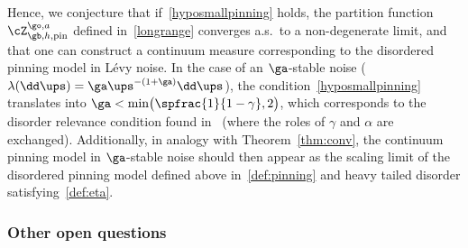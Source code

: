 Hence, we conjecture that if~\eqref{hyposmallpinning} holds, the partition function~$\cZ_{\gb,h,\mathrm{pin}}^{\go,a}$ defined in~\eqref{longrange} converges a.s.\ to a non-degenerate limit, and that one can construct a continuum measure corresponding to the disordered pinning model in Lévy noise.
In the case of an $\ga$-stable noise (\ie $\lambda(\dd \ups) = \ga \ups^{-(1+\ga)} \dd \ups$),
the condition~\eqref{hyposmallpinning} translates into $\ga < \min \bigl(\spfrac{1}{1-\gamma}, 2 \bigr)$,
which corresponds to the disorder relevance condition found in~\cite{LS17} (where the roles of $\gamma$ and $\alpha$ are exchanged).
Additionally, in analogy with Theorem~\ref{thm:conv}, the continuum pinning model in $\ga$-stable noise should then appear
as the scaling limit of the disordered pinning model defined
above in~\eqref{def:pinning}
and heavy tailed disorder satisfying~\eqref{def:eta}.

\subsubsection{Other open questions}

